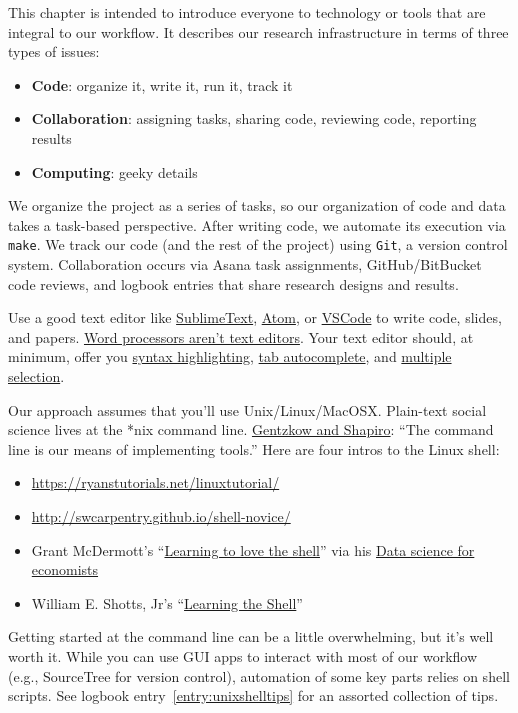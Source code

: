 This chapter is intended to introduce everyone to technology or tools that are integral to our workflow.
It describes our research infrastructure in terms of three types of issues:
\begin{itemize}
\item \textbf{Code}: organize it, write it, run it, track it
\item \textbf{Collaboration}: assigning tasks, sharing code, reviewing code, reporting results
\item \textbf{Computing}: geeky details
\end{itemize}

We organize the project as a series of tasks, so our organization of code and data takes a task-based perspective.
After writing code, we automate its execution via \texttt{make}.
We track our code (and the rest of the project) using \texttt{Git}, a version control system.
Collaboration occurs via Asana task assignments, GitHub/BitBucket code reviews, and logbook entries that share research designs and results.

Use a good text editor like
\href{https://www.sublimetext.com/}{SublimeText},
\href{https://atom.io/}{Atom},
or
\href{https://code.visualstudio.com/}{VSCode}
to write code, slides, and papers.
\href{http://plain-text.co/write-and-edit.html}{Word processors aren't text editors}.
Your text editor should, at minimum, offer you
\href{https://en.wikipedia.org/wiki/Syntax_highlighting}{syntax highlighting},
\href{https://en.wikipedia.org/wiki/Command-line_completion}{tab autocomplete},
and \href{https://www.sublimetext.com/}{multiple selection}.

Our approach assumes that you'll use Unix/Linux/MacOSX.
Plain-text social science lives at the *nix command line.
\href{https://github.com/gslab-econ/ra-manual/wiki/Getting-Started}{Gentzkow and Shapiro}: ``The command line is our means of implementing tools.''
Here are four intros to the Linux shell:
\begin{itemize}
	\item \url{https://ryanstutorials.net/linuxtutorial/}
	\item \url{http://swcarpentry.github.io/shell-novice/}
	\item Grant McDermott's ``\href{https://raw.githack.com/uo-ec607/lectures/master/03-shell/03-shell.html\#1}{Learning to love the shell}'' via his \href{https://github.com/uo-ec607/lectures}{Data science for economists}
	\item William E. Shotts, Jr's ``\href{http://linuxcommand.org/lc3_learning_the_shell.php}{Learning the Shell}''
\end{itemize}
Getting started at the command line can be a little overwhelming, but it's well worth it.
While you can use GUI apps to interact with most of our workflow (e.g., SourceTree for version control),
automation of some key parts relies on shell scripts.
See logbook entry~\ref{entry:unixshelltips} for an assorted collection of tips.

